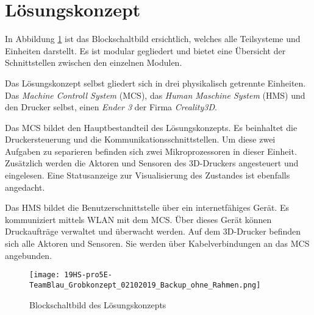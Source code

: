 \clearpage
\section{Lösungskonzept}\label{sec:Loesungskonzept}
In Abbildung \ref{img:Grobkonzept} ist das Blockschaltbild ersichtlich, welches alle Teilsysteme und Einheiten darstellt. Es ist modular gegliedert und bietet eine Übersicht der Schnittstellen zwischen den einzelnen Modulen. 

Das Lösungskonzept selbst gliedert sich in drei physikalisch getrennte Einheiten. Das \textit{Machine Controll System} (MCS), das \textit{Human Maschine System} (HMS) und den Drucker selbst, einen \textit{Ender 3} der Firma \textit{Creality3D}. 

Das MCS bildet den Hauptbestandteil des Lösungskonzepts. Es beinhaltet die Druckersteuerung und die Kommunikationsschnittstellen. Um diese zwei Aufgaben zu separieren befinden sich zwei Mikroprozessoren in dieser Einheit. Zusätzlich werden die Aktoren und Sensoren des 3D-Druckers  angesteuert und eingelesen. Eine Statusanzeige zur Visualisierung des Zustandes ist ebenfalls angedacht.

Das HMS bildet die Benutzerschnittstelle über ein internetfähiges Gerät. Es kommuniziert mittels WLAN mit dem MCS. Über dieses Gerät können Druckaufträge verwaltet und überwacht werden. Auf dem 3D-Drucker befinden sich alle Aktoren und Sensoren. Sie werden über Kabelverbindungen an das MCS angebunden.



\begin{figure}
	\centering
	\texttt{[image: 19HS-pro5E-TeamBlau\_Grobkonzept\_02102019\_Backup\_ohne\_Rahmen.png]}
	\caption{Blockschaltbild des Lösungskonzepts}
	\label{img:Grobkonzept}
\end{figure} 








